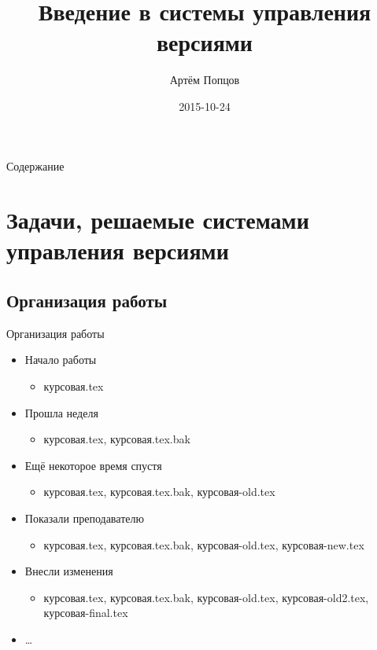 \documentclass[presentation]{beamer}
\author{Артём Попцов}
\date{2015-10-24}
\title{Введение в системы управления версиями}
\begin{document}
\maketitle



\begin{frame}{Содержание}
  \setcounter{tocdepth}{1}
  \tableofcontents
\end{frame}



\section{Задачи, решаемые системами управления версиями}

\subsection{Организация работы}

\begin{frame}{Организация работы}
  \begin{itemize}
  \item Начало работы
    \begin{itemize}
    \item курсовая.tex
    \end{itemize}
  \item Прошла неделя
    \begin{itemize}
    \item курсовая.tex, курсовая.tex.bak
    \end{itemize}
  \item Ещё некоторое время спустя
    \begin{itemize}
    \item курсовая.tex, курсовая.tex.bak, курсовая-old.tex
    \end{itemize}
  \item Показали преподавателю
    \begin{itemize}
    \item курсовая.tex, курсовая.tex.bak, курсовая-old.tex,
      курсовая-new.tex
    \end{itemize}
  \item Внесли изменения
    \begin{itemize}
    \item курсовая.tex, курсовая.tex.bak, курсовая-old.tex,
      курсовая-old2.tex, курсовая-final.tex
    \end{itemize}
  \item \ldots{}
  \end{itemize}
\end{frame}
\end{document}
